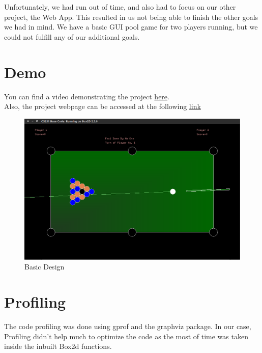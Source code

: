 \documentclass[a4paper,12pt]{article}
\begin{document}
Unfortunately, we had run out of time, and also had to focus on our other project, the Web App. This resulted in us not being able to finish the 
other goals we had in mind. We have a basic GUI pool game for two players running, but we could not fulfill any of our additional goals.\\

\section{Demo}
You can find a video\cite{software} demonstrating the project \href{https://www.youtube.com/watch?v=ccL42N-W_bU}{here}.\\
Also, the project webpage\cite{template} can be accessed at the following \href{http://www.cse.iitb.ac.in/~rishabhagarwal/links/web/index.html}{link}\\

\begin{figure}
	\centering
	\includegraphics[scale = 0.35]{Report/images/main.png}
	\caption{Basic Design}
\end{figure}
\clearpage

\section{\cite{gprof}Profiling} 
The code profiling was done using gprof and the graphviz package. 
In our case, Profiling didn't help much to optimize the code as the most of time was taken inside the inbuilt Box2d functions. 
\end{document}
